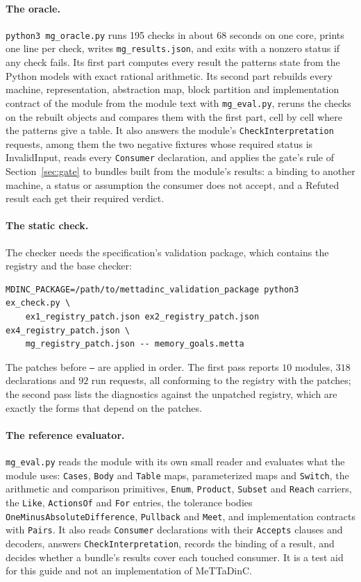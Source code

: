 \documentclass[11pt]{article}
\newcommand{\fpath}[1]{\nolinkurl{#1}}
\newcommand{\code}[1]{\texttt{#1}}
\theoremstyle{definition}
\theoremstyle{plain}
\begin{document}
\paragraph{The oracle.} \code{python3 mg\_oracle.py} runs 195 checks in
about 68 seconds on one core, prints one line per check, writes
\fpath{mg_results.json}, and exits with a nonzero status if any check fails. Its first part
computes every result the patterns state from the Python models with exact rational arithmetic. Its
second part rebuilds every machine, representation, abstraction map, block partition and
implementation contract of the module from the module text with \fpath{mg_eval.py}, reruns the
checks on the rebuilt objects and compares them with the first part, cell by cell where the
patterns give a table. It also answers the module's \code{CheckInterpretation} requests, among them
the two negative fixtures whose required status is InvalidInput, reads every \code{Consumer}
declaration, and applies the gate's rule of Section~\ref{sec:gate} to bundles built from the
module's results: a binding to another machine, a status or assumption the consumer does not
accept, and a Refuted result each get their required verdict.

\paragraph{The static check.} The checker needs the specification's validation package, which
contains the registry and the base checker:
\begin{lstlisting}
MDINC_PACKAGE=/path/to/mettadinc_validation_package python3 ex_check.py \
    ex1_registry_patch.json ex2_registry_patch.json ex4_registry_patch.json \
    mg_registry_patch.json -- memory_goals.metta
\end{lstlisting}
The patches before \code{--} are applied in order. The first pass reports $10$
modules, $318$ declarations and $92$ run requests, all
conforming to the registry with the patches; the second pass lists the diagnostics against the
unpatched registry, which are exactly the forms that depend on the patches.

\paragraph{The reference evaluator.} \fpath{mg_eval.py} reads the module with its own small reader
and evaluates what the module uses: \code{Cases}, \code{Body} and \code{Table} maps, parameterized
maps and \code{Switch}, the arithmetic and comparison primitives, \code{Enum}, \code{Product},
\code{Subset} and \code{Reach} carriers, the \code{Like}, \code{ActionsOf} and \code{For} entries,
the tolerance bodies \code{OneMinusAbsoluteDifference}, \code{Pullback} and \code{Meet}, and
implementation contracts with \code{Pairs}. It also reads \code{Consumer} declarations with their
\code{Accepts} clauses and decoders, answers \code{CheckInterpretation}, records the binding of a
result, and decides whether a bundle's results cover each touched consumer. It is a test aid for
this guide and not an implementation of MeTTaDinC.
\end{document}
